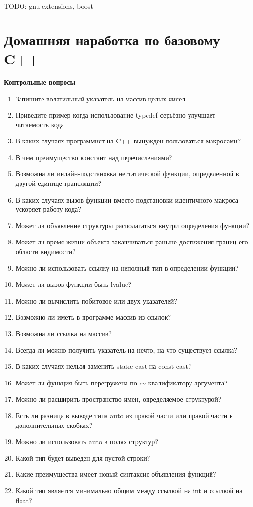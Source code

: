 \documentclass[a4paper,12pt,oneside]{book}
\begin{document}
TODO: gnu extensions, boost
\fi

\pagebreak
\section{Домашняя наработка по базовому C++}

\textbf{Контрольные вопросы} 

\begin{enumerate}
\item Запишите волатильный указатель на массив целых чисел
\item Приведите пример когда использование typedef серьёзно улучшает читаемость кода
\item В каких случаях программист на C++ вынужден пользоваться макросами?
\item В чем преимущество констант над перечислениями?
\item Возможна ли инлайн-подстановка нестатической функции, определенной в другой единице трансляции?
\item В каких случаях вызов функции вместо подстановки идентичного макроса ускоряет работу кода?
\item Может ли объявление структуры располагаться внутри определения функции?
\item Может ли время жизни объекта заканчиваться раньше достижения границ его области видимости?
\item Можно ли использовать ссылку на неполный тип в определении функции?
\item Может ли вызов функции быть lvalue?
\item Можно ли вычислить побитовое или двух указателей?
\item Возможно ли иметь в программе массив из ссылок?
\item Возможна ли ссылка на массив?
\item Всегда ли можно получить указатель на нечто, на что существует ссылка?
\item В каких случаях нельзя заменить static cast на const cast?
\item Может ли функция быть перегружена по cv-квалификатору аргумента?
\item Можно ли расширить пространство имен, определяемое структурой?
\item Есть ли разница в выводе типа auto из правой части или правой части в дополнительных скобках?
\item Можно ли использовать auto в полях структур?
\item Какой тип будет выведен для пустой строки?
\item Какие преимущества имеет новый синтаксис объявления функций?
\item Какой тип является минимально общим между ссылкой на int и ссылкой на float?
\end{enumerate}
\end{document}
